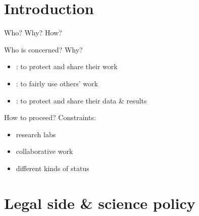 \documentclass[10pt,xcolor=svgnames]{beamer}
\begin{document}
\section{Introduction}
\begin{frame}{Who? Why? How?}

  \begin{block}{Who is concerned? Why?}
    \begin{itemize}
      \item {}: to protect and share their work
      \item {}: to fairly use others' work
      \item {}: to protect and share their data \& results
    \end{itemize}
  \end{block}

  \begin{block}{How to proceed?}
    Constraints:
    \begin{itemize}
      \item research labs
      \item collaborative work
      \item different kinds of status
    \end{itemize}
  \end{block}

\end{frame}

\section{Legal side \& science policy}
\end{document}
